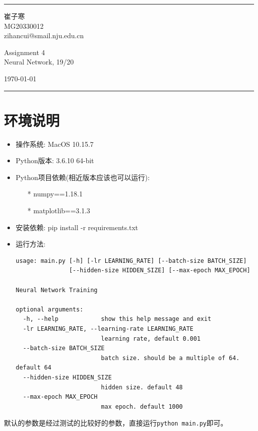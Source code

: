 \documentclass[UTF8]{ctexart}
\begin{document}
\fancyhead[C]{}
\hrule \medskip %
\begin{minipage}{0.295\textwidth} 
\raggedright
\footnotesize
崔子寒 \hfill\\   
MG20330012 \hfill\\
zihancui@smail.nju.edu.cn
\end{minipage}
\begin{minipage}{0.4\textwidth} 
\centering 
\large 
Assignment 4\\ 
\normalsize 
Neural Network, 19/20\\ 
\end{minipage}
\begin{minipage}{0.295\textwidth} 
\raggedleft
\today\hfill\\
\end{minipage}
\medskip\hrule 
\bigskip

\section{环境说明}
\begin{itemize}
    \item 操作系统: MacOS 10.15.7
    \item Python版本: 3.6.10 64-bit
    \item Python项目依赖(相近版本应该也可以运行): 
    \begin{itemize}
        \item[*] numpy==1.18.1
        \item[*] matplotlib==3.1.3
    \end{itemize}
    \item 安装依赖: pip install -r requirements.txt
    \item 运行方法: 
    \begin{lstlisting}[language={}]
usage: main.py [-h] [-lr LEARNING_RATE] [--batch-size BATCH_SIZE]
               [--hidden-size HIDDEN_SIZE] [--max-epoch MAX_EPOCH]

Neural Network Training

optional arguments:
  -h, --help            show this help message and exit
  -lr LEARNING_RATE, --learning-rate LEARNING_RATE
                        learning rate, default 0.001
  --batch-size BATCH_SIZE
                        batch size. should be a multiple of 64. default 64
  --hidden-size HIDDEN_SIZE
                        hidden size. default 48
  --max-epoch MAX_EPOCH
                        max epoch. default 1000

    \end{lstlisting}
\end{itemize}
默认的参数是经过测试的比较好的参数，直接运行\texttt{python main.py}即可。
\end{document}
